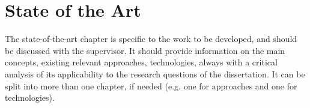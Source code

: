 
\chapter{State of the Art} %

\label{chap:Chapter2} %


The state-of-the-art chapter is specific to the work to be developed, and should be discussed with the supervisor.  It should provide information on the main concepts, existing relevant approaches, technologies, always with a critical analysis of its applicability to the research questions of the dissertation. It can be split into more than one chapter, if needed (e.g. one for approaches and one for technologies).